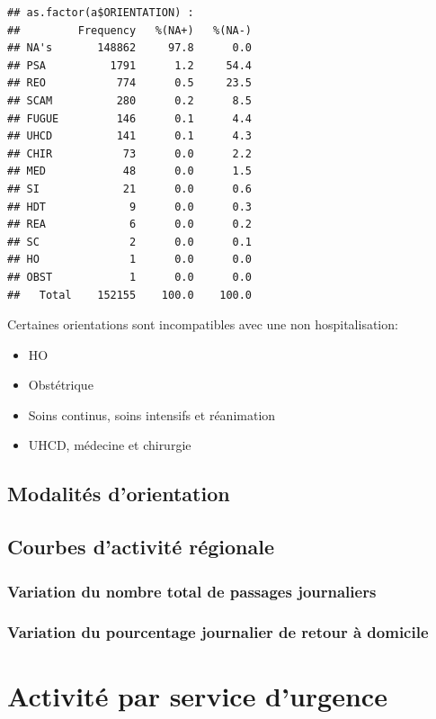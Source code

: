 \documentclass[12pt,english,french,twoside]{report}\usepackage[]{graphicx}\usepackage[]{color}
\makeatletter
\newenvironment{kframe}{%
 \def\at@end@of@kframe{}%
 \ifinner\ifhmode%
  \def\at@end@of@kframe{\end{minipage}}%
  \begin{minipage}{\columnwidth}%
 \fi\fi%
 \def\FrameCommand##1{\hskip\@totalleftmargin \hskip-\fboxsep
 \colorbox{shadecolor}{##1}\hskip-\fboxsep
     \hskip-\linewidth \hskip-\@totalleftmargin \hskip\columnwidth}%
 \MakeFramed {\advance\hsize-\width
   \@totalleftmargin\z@ \linewidth\hsize
   \@setminipage}}%
 {\par\unskip\endMakeFramed%
 \at@end@of@kframe}
\newenvironment{knitrout}{}{} %
\makeatother
\begin{document}
\begin{knitrout}
\begin{kframe}\begin{verbatim}
## as.factor(a$ORIENTATION) : 
##         Frequency   %(NA+)   %(NA-)
## NA's       148862     97.8      0.0
## PSA          1791      1.2     54.4
## REO           774      0.5     23.5
## SCAM          280      0.2      8.5
## FUGUE         146      0.1      4.4
## UHCD          141      0.1      4.3
## CHIR           73      0.0      2.2
## MED            48      0.0      1.5
## SI             21      0.0      0.6
## HDT             9      0.0      0.3
## REA             6      0.0      0.2
## SC              2      0.0      0.1
## HO              1      0.0      0.0
## OBST            1      0.0      0.0
##   Total    152155    100.0    100.0
\end{verbatim}
\end{kframe}
\end{knitrout}

Certaines orientations sont incompatibles avec une non hospitalisation:
\begin{itemize}
  \item HO
  \item Obstétrique
  \item Soins continus, soins intensifs et réanimation
  \item UHCD, médecine et chirurgie
  
\end{itemize}




\chapter{Modalités d'orientation}

\chapter{Courbes d'activité régionale}
\section*{Variation du nombre total de passages journaliers}
\section*{Variation du pourcentage journalier de retour à domicile}

\part{Activité par service d'urgence}
\end{document}
